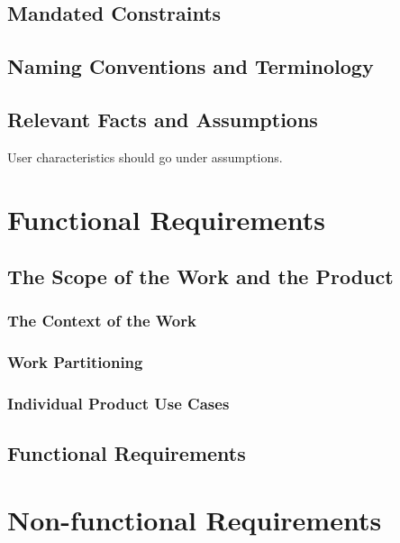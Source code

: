 \documentclass[12pt, titlepage]{article}
\begin{document}
\subsection{Mandated Constraints}

\subsection{Naming Conventions and Terminology}

\subsection{Relevant Facts and Assumptions}

User characteristics should go under assumptions.

\section{Functional Requirements}

\subsection{The Scope of the Work and the Product}

\subsubsection{The Context of the Work}

\subsubsection{Work Partitioning}

\subsubsection{Individual Product Use Cases}

\subsection{Functional Requirements}

\section{Non-functional Requirements} %
\end{document}

